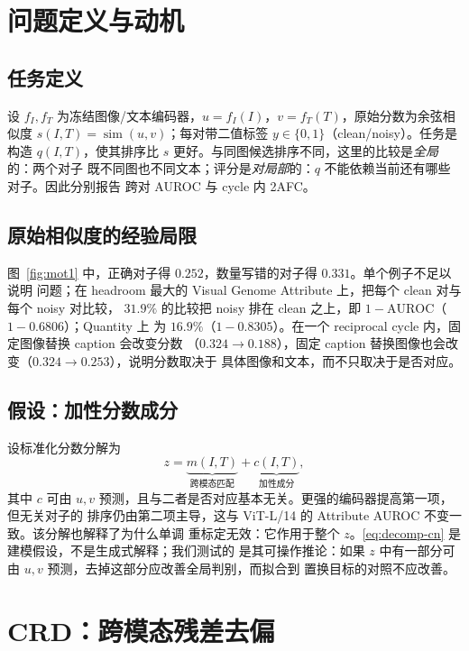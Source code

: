 \documentclass[10pt,twocolumn,a4paper]{ctexart}
\begin{document}
\section{问题定义与动机}
\label{sec:problem-cn}

\subsection{任务定义}
设 $f_I,f_T$ 为冻结图像/文本编码器，$u=f_I(I)$，$v=f_T(T)$，原始分数为余弦相似度
$s(I,T)=\operatorname{sim}(u,v)$；每对带二值标签 $y\in\{0,1\}$（clean/noisy）。任务是构造
$q(I,T)$，使其排序比 $s$ 更好。与同图候选排序不同，这里的比较是\emph{全局}的：两个对子
既不同图也不同文本；评分是\emph{对局部}的：$q$ 不能依赖当前还有哪些对子。因此分别报告
跨对 AUROC 与 cycle 内 2AFC。

\subsection{原始相似度的经验局限}
图~\ref{fig:mot1} 中，正确对子得 $0.252$，数量写错的对子得 $0.331$。单个例子不足以说明
问题；在 headroom 最大的 Visual Genome Attribute 上，把每个 clean 对与每个 noisy 对比较，
$31.9\%$ 的比较把 noisy 排在 clean 之上，即 $1-\mathrm{AUROC}$（$1-0.6806$）；Quantity 上
为 $16.9\%$（$1-0.8305$）。在一个 reciprocal cycle 内，固定图像替换 caption 会改变分数
（$0.324\to0.188$），固定 caption 替换图像也会改变（$0.324\to0.253$），说明分数取决于
具体图像和文本，而不只取决于是否对应。

\subsection{假设：加性分数成分}
设标准化分数分解为
\begin{equation}
  z=\underbrace{m(I,T)}_{\text{跨模态匹配}}+\underbrace{c(I,T)}_{\text{加性成分}},
  \label{eq:decomp-cn}
\end{equation}
其中 $c$ 可由 $u,v$ 预测，且与二者是否对应基本无关。更强的编码器提高第一项，但无关对子的
排序仍由第二项主导，这与 ViT-L/14 的 Attribute AUROC 不变一致。该分解也解释了为什么单调
重标定无效：它作用于整个 $z$。\eqref{eq:decomp-cn} 是建模假设，不是生成式解释；我们测试的
是其可操作推论：如果 $z$ 中有一部分可由 $u,v$ 预测，去掉这部分应改善全局判别，而拟合到
置换目标的对照不应改善。

\section{CRD：跨模态残差去偏}
\label{sec:method-cn}
\end{document}
